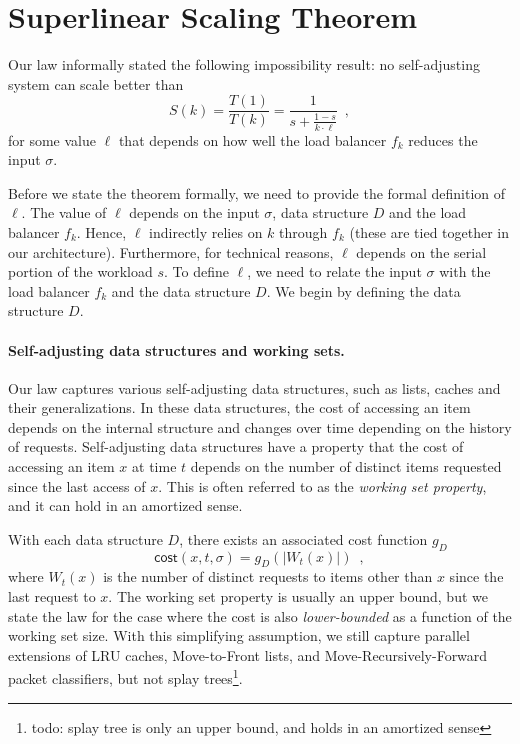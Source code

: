 \section{Superlinear Scaling Theorem}
\label{sec:apx}

Our law informally stated the following impossibility result: no self-adjusting system can scale better than
\begin{equation*}
  S(k) = \frac{T(1)}{T(k)} = \frac1{s + \frac{1-s}{k \cdot \ell}} \enspace ,
\end{equation*}
for some value $\ell$ that depends on how well the load balancer $f_k$ reduces the input $\sigma$.

Before we state the theorem formally, we need to provide the formal definition of $\ell$.
The value of $\ell$ depends on the input $\sigma$, data structure $D$ and the load balancer $f_k$. Hence, $\ell$ indirectly relies on $k$ through $f_k$ (these are tied together in our architecture). Furthermore, for technical reasons, $\ell$ depends on the serial portion of the workload $s$.
To define $\ell$, we need to relate the input $\sigma$ with the load balancer $f_k$ and the data structure $D$.
We begin by defining the data structure $D$.



\paragraph*{Self-adjusting data structures and working sets.}
Our law captures various self-adjusting data structures, such as lists, caches and their generalizations.
In these data structures, the cost of accessing an item depends on the internal structure and changes over time depending on the history of requests.
Self-adjusting data structures have a property that the cost of accessing an item $x$ at time $t$ depends on the number of distinct items requested since the last access of $x$.
This is often referred to as the \emph{working set property}, and it can hold in an amortized sense.

With each data structure $D$, there exists an associated cost function $g_D$ 
\[
	\textsf{cost}(x, t, \sigma) = g_D(|W_t(x)|) \enspace ,
\]
where $W_t(x)$ is the number of distinct requests to items other than $x$ since the last request to $x$.
The working set property is usually an upper bound, but we state the law for the case where the cost is also \emph{lower-bounded} as a function of the working set size.
With this simplifying assumption, we still capture parallel extensions of LRU caches, Move-to-Front lists, and Move-Recursively-Forward packet classifiers, but not splay trees\footnote{todo: splay tree is only an upper bound, and holds in an amortized sense}. 

